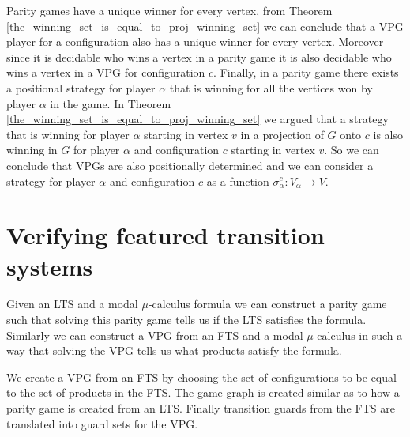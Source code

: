 Parity games have a unique winner for every vertex, from Theorem \ref{the_winning_set_is_equal_to_proj_winning_set} we can conclude that a VPG player for a configuration also has a unique winner for every vertex. Moreover since it is decidable who wins a vertex in a parity game it is also decidable who wins a vertex in a VPG for configuration $c$. Finally, in a parity game there exists a positional strategy for player $\alpha$ that is winning for all the vertices won by player $\alpha$ in the game. In Theorem \ref{the_winning_set_is_equal_to_proj_winning_set} we argued that a strategy that is winning for player $\alpha$ starting in vertex $v$ in a projection of $G$ onto $c$ is also winning in $G$ for player $\alpha$ and configuration $c$ starting in vertex $v$. So we can conclude that VPGs are also positionally determined and we can consider a strategy for player $\alpha$ and configuration $c$ as a function $\sigma_\alpha^c : V_\alpha \rightarrow V$.

\section{Verifying featured transition systems}
Given an LTS and a modal $\mu$-calculus formula we can construct a parity game such that solving this parity game tells us if the LTS satisfies the formula. Similarly we can construct a VPG from an FTS and a modal $\mu$-calculus in such a way that solving the VPG tells us what products satisfy the formula.

We create a VPG from an FTS by choosing the set of configurations to be equal to the set of products in the FTS. The game graph is created similar as to how a parity game is created from an LTS. Finally transition guards from the FTS are translated into guard sets for the VPG.

